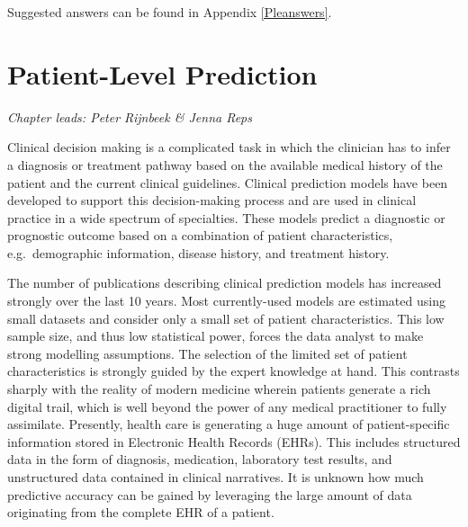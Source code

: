 \documentclass[11pt]{book}
\theoremstyle{definition}
\theoremstyle{definition}
\theoremstyle{definition}
\theoremstyle{remark}
\begin{document}
Suggested answers can be found in Appendix \ref{Pleanswers}.

\chapter{Patient-Level Prediction}\label{PatientLevelPrediction}

\emph{Chapter leads: Peter Rijnbeek \& Jenna Reps}


Clinical decision making is a complicated task in which the clinician
has to infer a diagnosis or treatment pathway based on the available
medical history of the patient and the current clinical guidelines.
Clinical prediction models have been developed to support this
decision-making process and are used in clinical practice in a wide
spectrum of specialties. These models predict a diagnostic or prognostic
outcome based on a combination of patient characteristics,
e.g.~demographic information, disease history, and treatment history.
 

The number of publications describing clinical prediction models has
increased strongly over the last 10 years. Most currently-used models
are estimated using small datasets and consider only a small set of
patient characteristics. This low sample size, and thus low statistical
power, forces the data analyst to make strong modelling assumptions. The
selection of the limited set of patient characteristics is strongly
guided by the expert knowledge at hand. This contrasts sharply with the
reality of modern medicine wherein patients generate a rich digital
trail, which is well beyond the power of any medical practitioner to
fully assimilate. Presently, health care is generating a huge amount of
patient-specific information stored in Electronic Health Records (EHRs).
This includes structured data in the form of diagnosis, medication,
laboratory test results, and unstructured data contained in clinical
narratives. It is unknown how much predictive accuracy can be gained by
leveraging the large amount of data originating from the complete EHR of
a patient. 
\end{document}
